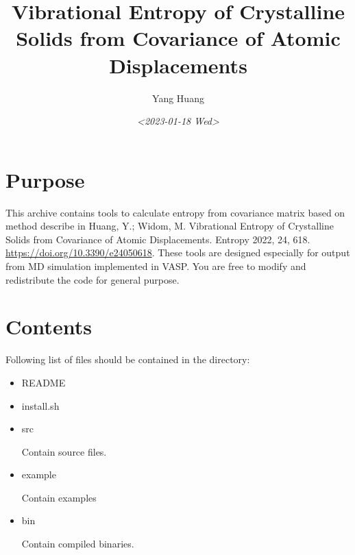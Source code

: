 \documentclass[11pt]{article}
\author{Yang Huang}
\date{\textit{<2023-01-18 Wed>}}
\title{Vibrational Entropy of Crystalline Solids from Covariance of Atomic Displacements}
\begin{document}
\maketitle
\tableofcontents


\section{Purpose}
\label{sec:orgdec938a}
This archive contains tools to calculate entropy from covariance matrix based
on method describe in Huang, Y.; Widom, M. Vibrational Entropy of Crystalline
Solids from Covariance of Atomic Displacements. Entropy 2022, 24, 618.
\url{https://doi.org/10.3390/e24050618}.
These tools are designed especially for output from MD simulation implemented
in VASP. You are free to modify and redistribute the code for general purpose.

\section{Contents}
\label{sec:org6d808f0}
Following list of files should be contained in the directory:
\begin{itemize}
\item README

\item install.sh

\item src

Contain source files.

\item example

Contain examples

\item bin

Contain compiled binaries.
\end{itemize}
\end{document}
